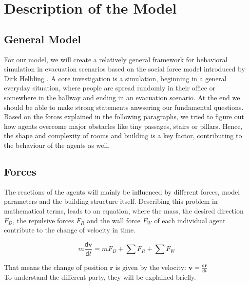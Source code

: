 \documentclass[11pt]{article}
\begin{document}

\section{Description of the Model}
\subsection{General Model}

For our model, we will create a relatively general framework for behavioral
simulation in evacuation scenarios based on the social force model introduced by Dirk Helbling \cite{SDFEP}.
A core investigation is a simulation, beginning in a general everyday situation,
where people are spread randomly in their office or somewhere in the hallway and ending in an evacuation scenario.
At the end we should be able to make strong
statements anwsering our fundamental questions.
Based on the forces explained in the following paragraphs, we tried to figure
out how agents overcome major obstacles like tiny passages, stairs or pillars. Hence, the
shape and complexity of rooms and building is a key factor, contributing to the behaviour of the
agents as well. 


\subsection {Forces}
The reactions of the agents will mainly be influenced by different forces, model
parameters and the building structure itself. 
Describing this problem in mathematical terms, leads to an equation, where the mass, the desired direction $F_{D}$, the repulsive forces $F_{R}$ and the wall force $F_{W}$ of each individual agent contribute to the change of velocity in time.

\begin{equation} \label{eq:eikonal}
m\frac{\mathsf{d}\mathbf{v}}{\mathsf{d}t}=mF_{D}+\sum{F_{R}}+\sum{F_{W}}
\end{equation}

That means the change of position $\mathbf{r}$ is given by the velocity: $\mathbf{v}=\frac{\mathsf{d}\mathbf{r}}{\mathsf{d}t}$\\
To understand the different party, they will be explained briefly.
\end{document}
